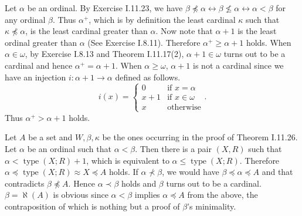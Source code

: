 \documentclass[12pt]{article}
\newcommand{\type}{\mathop{\mathrm{type}}}
\theoremstyle{definition}
\newenvironment{customthm}[1]
  {\renewcommand\theinnercustomthm{#1}\innercustomthm}
  {\endinnercustomthm}
\begin{document}
\begin{customthm}{I.11.28} Let $\alpha$ be an ordinal. By Exercise I.11.23, we have $\beta\not\preccurlyeq\alpha\leftrightarrow\beta\not\leq\alpha\leftrightarrow\alpha<\beta$ for any ordinal $\beta$. Thus $\alpha^+$, which is by definition the least cardinal $\kappa$ such that $\kappa\not\preccurlyeq\alpha$, is the least cardinal greater than $\alpha$. Now note that $\alpha+1$ is the least ordinal greater than $\alpha$ (See Exercise I.8.11). Therefore $\alpha^+\geq\alpha+1$ holds. When $\alpha\in\omega$, by Exercise I.8.13 and Theorem I.11.17(2), $\alpha+1\in\omega$ turns out to be a cardinal and hence $\alpha^+=\alpha+1$. When $\alpha\geq\omega$, $\alpha+1$ is not a cardinal since we have an injection $i:\alpha+1\rightarrow\alpha$ defined as follows.
\[i(x)=
  \begin{cases}
    0 & \text{if } x=\alpha \\
    x+1 & \text{if } x\in\omega \\
    x & \text{otherwise}
  \end{cases}.
\]
Thus $\alpha^+>\alpha+1$ holds.
\end{customthm}

\begin{customthm}{I.11.29} Let $A$ be a set and $W,\beta,\kappa$ be the ones occurring in the proof of Theorem I.11.26. Let $\alpha$ be an ordinal such that $\alpha<\beta$. Then there is a pair $(X,R)$ such that $\alpha<\type(X;R)+1$, which is equivalent to $\alpha\leq\type(X;R)$. Therefore $\alpha\preccurlyeq\type(X;R)\approx X\preccurlyeq A$ holds. If $\alpha\not\prec\beta$, we would have $\beta\preccurlyeq\alpha\preccurlyeq A$ and that contradicts $\beta\not\preccurlyeq A$. Hence $\alpha\prec\beta$ holds and $\beta$ turns out to be a cardinal. $\beta=\aleph(A)$ is obvious since $\alpha<\beta$ implies $\alpha\preccurlyeq A$ from the above, the contraposition of which is nothing but a proof of $\beta$'s minimality.
\end{customthm}
\end{document}

